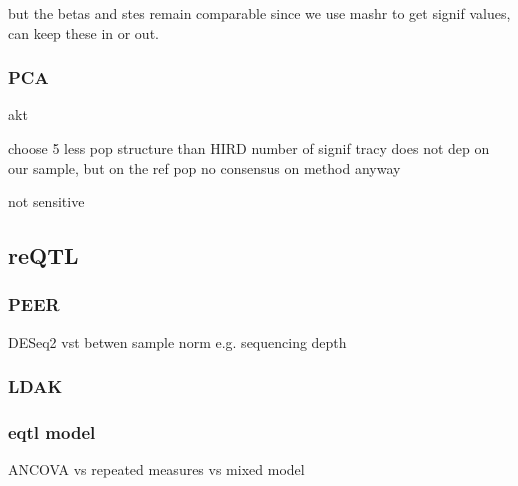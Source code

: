 \begin{outline}
    but the betas and stes remain comparable
    since we use mashr to get signif values, 
    can keep these in or out. 


\subsubsection{PCA}

akt

choose 5
    less pop structure than HIRD
    number of signif tracy does not dep on our sample, but on the ref pop 
    no consensus on method anyway

    not sensitive

\subsection{reQTL}

\subsubsection{PEER}

DESeq2 vst
betwen sample norm e.g. sequencing depth 

\subsubsection{LDAK}

\subsubsection{eqtl model}



ANCOVA vs repeated measures vs mixed model



\end{outline}
